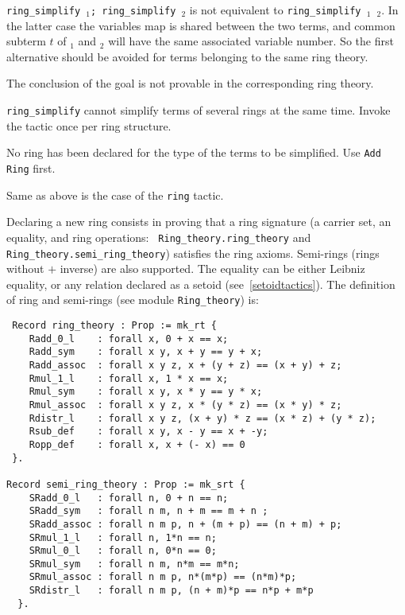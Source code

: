 \Warning \texttt{ring\_simplify \term$_1$; ring\_simplify \term$_2$} is
not equivalent to \texttt{ring\_simplify \term$_1$ \term$_2$}. In the
latter case the variables map is shared between the two terms, and
common subterm $t$ of \term$_1$ and \term$_2$ will have the same
associated variable number. So the first alternative should be
avoided for terms belonging to the same ring theory.


\begin{ErrMsgs}
\item {}
  The conclusion of the goal is not provable in the corresponding ring
  theory.
\item {}
  {\tt ring\_simplify} cannot simplify terms of several rings at the
  same time. Invoke the tactic once per ring structure.
\item {}
  No ring has been declared for the type of the terms to be
  simplified. Use {\tt Add Ring} first.
\item {}
  Same as above is the case of the {\tt ring} tactic.
\end{ErrMsgs}


Declaring a new ring consists in proving that a ring signature (a
carrier set, an equality, and ring operations: {\tt
Ring\_theory.ring\_theory} and {\tt Ring\_theory.semi\_ring\_theory})
satisfies the ring axioms. Semi-rings (rings without $+$ inverse) are
also supported. The equality can be either Leibniz equality, or any
relation declared as a setoid (see~\ref{setoidtactics}). The definition
of ring and semi-rings (see module {\tt Ring\_theory}) is:
\begin{verbatim}
 Record ring_theory : Prop := mk_rt {
    Radd_0_l    : forall x, 0 + x == x;
    Radd_sym    : forall x y, x + y == y + x;
    Radd_assoc  : forall x y z, x + (y + z) == (x + y) + z;
    Rmul_1_l    : forall x, 1 * x == x;
    Rmul_sym    : forall x y, x * y == y * x;
    Rmul_assoc  : forall x y z, x * (y * z) == (x * y) * z;
    Rdistr_l    : forall x y z, (x + y) * z == (x * z) + (y * z);
    Rsub_def    : forall x y, x - y == x + -y;
    Ropp_def    : forall x, x + (- x) == 0
 }.

Record semi_ring_theory : Prop := mk_srt {
    SRadd_0_l   : forall n, 0 + n == n;
    SRadd_sym   : forall n m, n + m == m + n ;
    SRadd_assoc : forall n m p, n + (m + p) == (n + m) + p;
    SRmul_1_l   : forall n, 1*n == n;
    SRmul_0_l   : forall n, 0*n == 0; 
    SRmul_sym   : forall n m, n*m == m*n;
    SRmul_assoc : forall n m p, n*(m*p) == (n*m)*p;
    SRdistr_l   : forall n m p, (n + m)*p == n*p + m*p
  }.
\end{verbatim}

